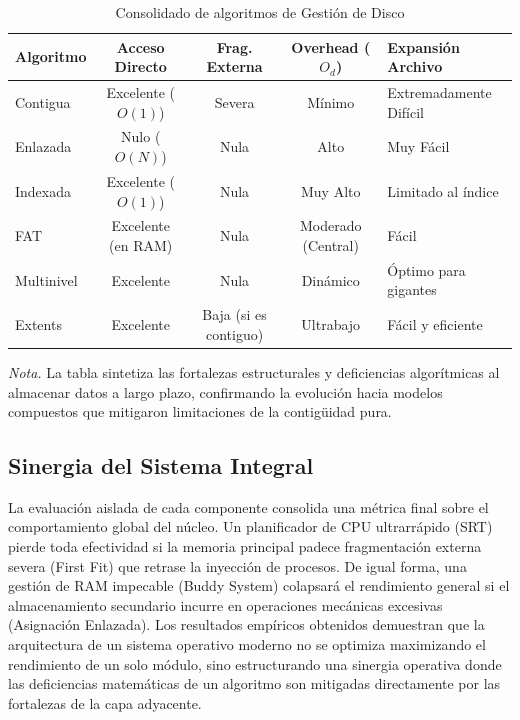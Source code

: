 \documentclass[12pt,a4paper]{article}
\begin{document}
\begin{table}[H]
\centering\small
\caption{Consolidado de algoritmos de Gestión de Disco}
\label{tab:comp_disco}
\begin{tabularx}{\textwidth}{X c c c X}
\toprule
\textbf{Algoritmo} & \textbf{Acceso Directo} & \textbf{Frag. Externa} & \textbf{Overhead ($O_d$)} & \textbf{Expansión Archivo} \\
\midrule
Contigua & Excelente ($O(1)$) & Severa & Mínimo & Extremadamente Difícil \\
Enlazada & Nulo ($O(N)$) & Nula & Alto & Muy Fácil \\
Indexada & Excelente ($O(1)$) & Nula & Muy Alto & Limitado al índice \\
FAT & Excelente (en RAM) & Nula & Moderado (Central) & Fácil \\
Multinivel & Excelente & Nula & Dinámico & Óptimo para gigantes \\
Extents & Excelente & Baja (si es contiguo) & Ultrabajo & Fácil y eficiente \\
\bottomrule
\end{tabularx}
    \par\vspace{0.2cm}\raggedright \textit{Nota.} La tabla sintetiza las fortalezas estructurales y deficiencias algorítmicas al almacenar datos a largo plazo, confirmando la evolución hacia modelos compuestos que mitigaron limitaciones de la contigüidad pura.
\end{table}

\subsection{Sinergia del Sistema Integral}
La evaluación aislada de cada componente consolida una métrica final sobre el comportamiento global del núcleo. Un planificador de CPU ultrarrápido (SRT) pierde toda efectividad si la memoria principal padece fragmentación externa severa (First Fit) que retrase la inyección de procesos. De igual forma, una gestión de RAM impecable (Buddy System) colapsará el rendimiento general si el almacenamiento secundario incurre en operaciones mecánicas excesivas (Asignación Enlazada). Los resultados empíricos obtenidos demuestran que la arquitectura de un sistema operativo moderno no se optimiza maximizando el rendimiento de un solo módulo, sino estructurando una sinergia operativa donde las deficiencias matemáticas de un algoritmo son mitigadas directamente por las fortalezas de la capa adyacente.
\end{document}
